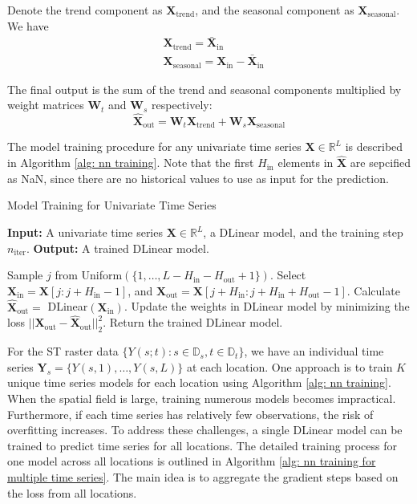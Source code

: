 \documentclass[11pt]{article}
\begin{document}
Denote the trend component as $\bm{X}_{\mathrm{trend}}$, and the seasonal component as $\bm{X}_{\mathrm{seasonal}}$. We have
\begin{align}
	&\bm{X}_{\mathrm{trend}} = \bar{\bm{X}}_{\mathrm{in}}\\
	&\bm{X}_{\mathrm{seasonal}} = \bm{X}_{\mathrm{in}} - \bar{\bm{X}}_{\mathrm{in}}
\end{align}

The final output is the sum of the trend and seasonal components multiplied by weight matrices $\bm{W}_t$ and $\bm{W}_s$ respectively:
\begin{equation}
	\hat{\bm{X}}_{\mathrm{out}} = \bm{W}_t \bm{X}_{\mathrm{trend}} + \bm{W}_s \bm{X}_{\mathrm{seasonal}}
\end{equation}



The model training procedure for any univariate time series $\bm{X} \in \mathbb{R}^L$ is described in Algorithm \ref{alg: nn training}. Note that the first $H_{\mathrm{in}}$ elements in $\hat{\bm{X}}$ are sepcified as NaN, since there are no historical values to use as input for the prediction.
 

\begin{algorithm}
\caption{Model Training for Univariate Time Series}\label{alg: nn training}
\begin{algorithmic}[1] %
\State \textbf{Input:} A univariate time series $\bm{X} \in \mathbb{R}^L$, a DLinear model, and the training step $n_{\mathrm{iter}}$.
\State \textbf{Output:} A trained DLinear model.

    \State Sample $j$ from Uniform$(\{1, \ldots, L-H_{\mathrm{in}}-H_{\mathrm{out}}+1\})$.
    \State Select $\bm{X}_{\mathrm{in}} = \bm{X}[j:j+H_{\mathrm{in}}-1]$, and $\bm{X}_{\mathrm{out}} = \bm{X}[j+H_{\mathrm{in}}:j+H_{\mathrm{in}}+H_{\mathrm{out}}-1]$.
    \State Calculate $\hat{\bm{X}}_{\mathrm{out}} =$ DLinear$(\bm{X}_{\mathrm{in}})$.
    \State Update the weights in DLinear model by minimizing the loss $||\bm{X}_{\mathrm{out}} - \hat{\bm{X}}_{\mathrm{out}}||^2_2$.
\EndFor
\State Return the trained DLinear model.
\end{algorithmic}
\end{algorithm}





For the ST raster data $\{Y(s;t):s\in \mathbb{D}_s, t\in \mathbb{D}_t\}$, we have an individual time series $\bm{Y}_s=\{Y(s,1),\ldots, Y(s,L)\}$ at each location. One approach is to train $K$ unique time series models for each location using Algorithm \ref{alg: nn training}. When the spatial field is large, training numerous models becomes impractical. Furthermore, if each time series has relatively few observations, the risk of overfitting increases. To address these challenges, a single DLinear model can be trained to predict time series for all locations. The detailed training process for one model across all locations is outlined in Algorithm \ref{alg: nn training for multiple time series}. The main idea is to aggregate the gradient steps based on the loss from all locations.
\end{document}
